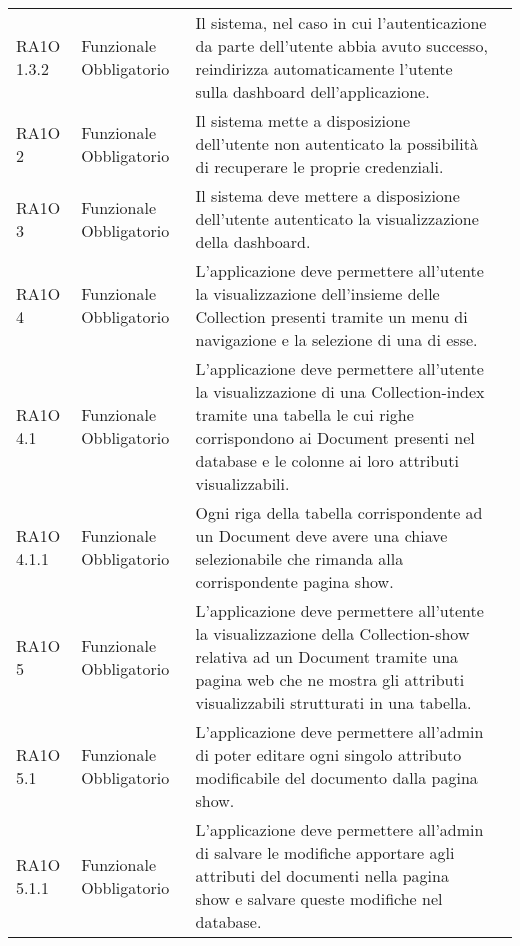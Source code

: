 \begin{center}
\begin{longtable}{ | p{2cm} | p{2cm} | p{5cm} | p{2cm} |}
 &  \\ \hline      
        RA1O 1.3.2 & Funzionale \newline  Obbligatorio  & Il sistema, nel caso in cui l'autenticazione da parte dell'utente abbia avuto successo, reindirizza automaticamente l'utente sulla dashboard dell'applicazione.
 &  \\ \hline      
        RA1O 2  & Funzionale \newline  Obbligatorio  & Il sistema mette a disposizione dell'utente non autenticato la possibilità  di recuperare le proprie credenziali. &  \\ \hline      
        RA1O 3  & Funzionale \newline  Obbligatorio  & Il sistema deve mettere a disposizione dell'utente autenticato la visualizzazione della dashboard. &  \\ \hline      
        RA1O 4 & Funzionale \newline  Obbligatorio  & L'applicazione deve permettere all'utente la visualizzazione dell'insieme delle Collection presenti tramite un menu di navigazione e la selezione di una di esse. &  \\ \hline      
        RA1O 4.1  & Funzionale \newline  Obbligatorio  & L'applicazione deve permettere all'utente la visualizzazione di una Collection-index tramite una tabella le cui righe corrispondono ai Document presenti nel database e le colonne ai loro attributi visualizzabili.  &  \\ \hline      
        RA1O 4.1.1  & Funzionale \newline  Obbligatorio  & Ogni riga della tabella corrispondente ad un Document deve avere una chiave selezionabile che rimanda alla corrispondente pagina show. &  \\ \hline      
        RA1O 5  & Funzionale \newline  Obbligatorio  & L'applicazione deve permettere all'utente la visualizzazione della Collection-show relativa ad un Document tramite una pagina web che ne mostra gli attributi visualizzabili strutturati in una tabella.
 &  \\ \hline      
        RA1O 5.1 & Funzionale \newline  Obbligatorio  & L'applicazione deve permettere all'admin di poter editare ogni singolo attributo modificabile del documento dalla pagina show. &  \\ \hline      
        RA1O 5.1.1  & Funzionale \newline  Obbligatorio  & L'applicazione deve permettere all'admin di salvare le modifiche apportare agli attributi del documenti nella pagina show e salvare queste modifiche nel database.

\end{longtable}
\end{center}
